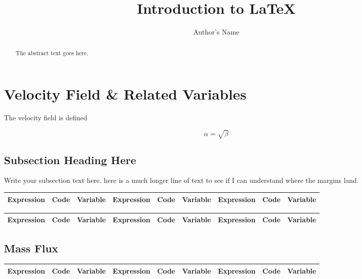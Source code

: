 \documentclass[10pt, letterpaper]{article}
\begin{document}
\title{Introduction to \LaTeX{}}
\author{Author's Name}

\maketitle

\begin{abstract}
The abstract text goes here.
\end{abstract}

\section{Velocity Field \& Related Variables}
The velocity field is defined 

\begin{equation}
    \label{simple_equation}
    \alpha = \sqrt{ \beta }
\end{equation}

\subsection{Subsection Heading Here}
Write your subsection text here. here is a much longer line of text to see if I can understand where the margins land.


\begin{table}
\centering
\begin{tabular}{|ccc||ccc||ccc|}
\hline
Expression & Code & Variable & Expression & Code & Variable & Expression & Code & Variable \\
\hline

\hline
\end{tabular}
\end{table}

\begin{table}
\centering
\begin{tabular}{|ccc||ccc||ccc|}
\hline
Expression & Code & Variable & Expression & Code & Variable & Expression & Code & Variable \\
\hline

\hline
\end{tabular}
\end{table}

\newpage

\subsection{Mass Flux}
\begin{table}
\centering
\begin{tabular}{|ccc||ccc||ccc|}
\hline
Expression & Code & Variable & Expression & Code & Variable & Expression & Code & Variable \\
\hline

\hline
\end{tabular}
\end{table}
\end{document}
